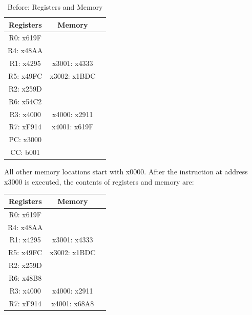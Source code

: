 \documentclass{article}
\begin{document}
\begin{enumerate}[label=(\alph*)]
\begin{enumerate}[label=(\roman*)]
\begin{table}[h]
            \centering
            \begin{tabular}{|c|c|c|}
            \hline
            \textbf{Registers} & \textbf{Memory} & \\
            \hline
            R0: x619F & & \\
            \hline
            R4: x48AA & & \\
            \hline
            R1: x4295 & x3001: x4333 & \\
            \hline
            R5: x49FC & x3002: x1BDC & \\
            \hline
            R2: x259D & & \\
            \hline
            R6: x54C2 & & \\
            \hline
            R3: x4000 & x4000: x2911 & \\
            \hline
            R7: xF914 & x4001: x619F & \\
            \hline
            PC: x3000 & & \\
            \hline
            CC: b001 & & \\
            \hline
            \end{tabular}
            \caption{Before: Registers and Memory}
            \end{table}
            \newline
            All other memory locations start with x0000. After the instruction at address x3000 is executed, the contents of registers and memory are:
            \begin{table}[h]
            \centering
            \begin{tabular}{|c|c|c|}
            \hline
            \textbf{Registers} & \textbf{Memory} & \\
            \hline
            R0: x619F & & \\
            \hline
            R4: x48AA & & \\
            \hline
            R1: x4295 & x3001: x4333 & \\
            \hline
            R5: x49FC & x3002: x1BDC & \\
            \hline
            R2: x259D & & \\
            \hline
            R6: x48B8 & & \\
            \hline
            R3: x4000 & x4000: x2911 & \\
            \hline
            R7: xF914 & x4001: x68A8 & \\
            \hline

\end{tabular}
\end{table}
\end{enumerate}
\end{enumerate}
\end{document}
